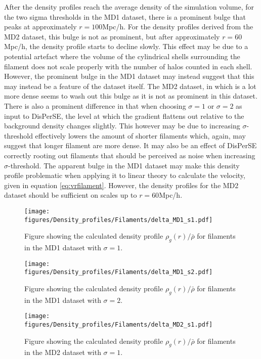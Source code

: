 After the density profiles reach the average density of the simulation volume, for the two sigma thresholds in the MD1 dataset, there is a prominent bulge that peaks at approximately $r=100$Mpc/h. For the density profiles derived from the MD2 dataset, this bulge is not as prominent, but after approximately $r=60$Mpc/h, the density profile starts to decline slowly. This effect may be due to a potential artefact where the volume of the cylindrical shells surrounding the filament does not scale properly with the number of halos counted in each shell. However, the prominent bulge in the MD1 dataset may instead suggest that this may instead be a feature of the dataset itself. The MD2 dataset, in which is a lot more dense seems to wash out this bulge as it is not as prominent in this dataset. There is also a prominent difference in that when choosing $\sigma=1$ or $\sigma=2$ as input to DisPerSE, the level at which the gradient flattens out relative to the background density changes slightly. This however may be due to increasing $\sigma$-threshold effectively lowers the amount of shorter filaments which, again, may suggest that longer filament are more dense. It may also be an effect of DisPerSE correctly rooting out filaments that should be perceived as noise when increasing $\sigma$-threshold. The apparent bulge in the MD1 dataset may make this density profile problematic when applying it to linear theory to calculate the velocity, given in equation \ref{eq:vrfilament}. However, the density profiles for the MD2 dataset should be sufficient on scales up to $r=60$Mpc/h.
\begin{figure}[H]
    \texttt{[image: figures/Density\_profiles/Filaments/delta\_MD1\_s1.pdf]}
    \caption{Figure showing the calculated density profile $\rho_g(r)/\bar{\rho}$ for filaments in the MD1 dataset with $\sigma=1$.}
    \label{fig:fildensitytMD1s1}
\end{figure}

\begin{figure}[H]
    \texttt{[image: figures/Density\_profiles/Filaments/delta\_MD1\_s2.pdf]}
    \caption{Figure showing the calculated density profile $\rho_g(r)/\bar{\rho}$ for filaments in the MD1 dataset with $\sigma=2$.}
    \label{fig:fildensitytMD1s2}
\end{figure}

\begin{figure}[H]
    \texttt{[image: figures/Density\_profiles/Filaments/delta\_MD2\_s1.pdf]}
    \caption{Figure showing the calculated density profile $\rho_g(r)/\bar{\rho}$ for filaments in the MD2 dataset with $\sigma=1$.}
    \label{fig:fildensitytMD2s1}
\end{figure}

